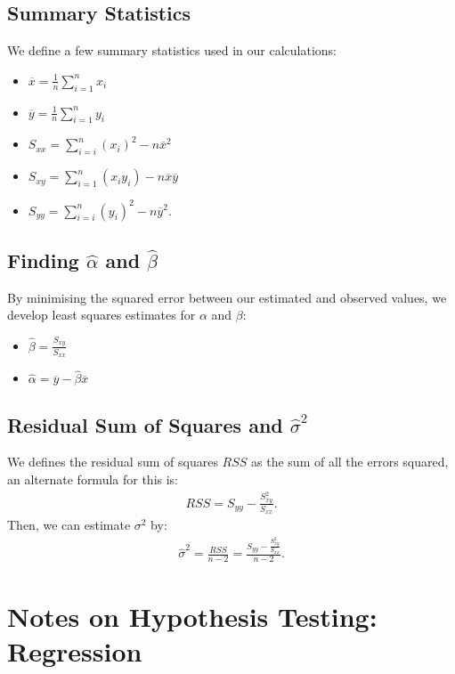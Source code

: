 \documentclass[a4paper, 12pt, twoside]{article}
\begin{document}
\subsection{Summary Statistics}

We define a few summary statistics used in our calculations:
\begin{itemize}
    \item $\overline{x} = \frac{1}{n}\sum_{i = 1}^n x_i$
    \item $\overline{y} = \frac{1}{n}\sum_{i = 1}^n y_i$
    \item $S_{xx} = \sum_{i=i}^n (x_i)^2 - n\overline{x}^2$
    \item $S_{xy} = \sum_{i=1}^n (x_i y_i) - n\overline{x}\overline{y}$
    \item $S_{yy} = \sum_{i=i}^n (y_i)^2 - n\overline{y}^2.$
\end{itemize}

\newpage

\subsection{Finding $\hat\alpha$ and $\hat\beta$}

By minimising the squared error between our estimated and observed
values, we develop least squares estimates for $\alpha$ and $\beta$:
\begin{itemize}
    \item $\hat\beta = \frac{S_{xy}}{S_{xx}}$
    \item $\hat\alpha = \overline{y} - \hat\beta\overline{x}$
\end{itemize}

\subsection{Residual Sum of Squares and $\hat\sigma^2$}

We defines the residual sum of squares $RSS$ as the sum of
all the errors squared, an alternate formula for this is:
\begin{align*}
    RSS = S_{yy} - \frac{S_{xy}^2}{S_{xx}}.
\end{align*}
Then, we can estimate $\sigma^2$ by:
\begin{align*}
    \hat\sigma^2 = \frac{RSS}{n - 2}
    = \frac{S_{yy} - \frac{S_{xy}^2}{S_{xx}}}{n - 2}.
\end{align*}

\section{Notes on Hypothesis Testing: Regression}
\end{document}

